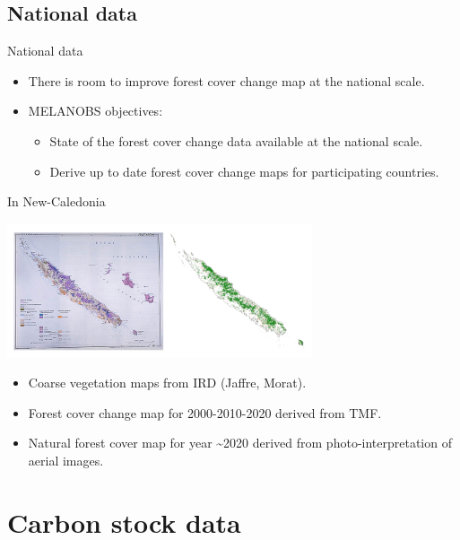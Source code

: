 \documentclass[10pt,table,dvipsnames,compress]{beamer}
\begin{document}
\subsection{National data}
\label{sec:org4156c30}

\begin{frame}[label={sec:org5f7b575}]{National data}
\begin{itemize}
\item There is room to improve forest cover change map at the national scale.

\item MELANOBS objectives:
\begin{itemize}
\item State of the forest cover change data available at the national scale.
\item Derive up to date forest cover change maps for participating countries.
\end{itemize}
\end{itemize}
\end{frame}

\begin{frame}[label={sec:orgc285709}]{In New-Caledonia}
\begin{center}
\includegraphics[width=9cm]{figs/fcc/fcc_nc.png}
\end{center}

\begin{itemize}
\item Coarse vegetation maps from IRD (Jaffre, Morat).
\item Forest cover change map for 2000-2010-2020 derived from TMF.
\item Natural forest cover map for year \textasciitilde{}2020 derived from photo-interpretation of aerial images.
\end{itemize}
\end{frame}

\section{Carbon stock data}
\label{sec:orgfad5893}
\end{document}
